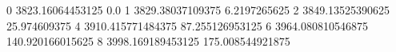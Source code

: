0 3823.16064453125 0.0
1 3829.38037109375 6.2197265625
2 3849.13525390625 25.974609375
4 3910.415771484375 87.255126953125
6 3964.080810546875 140.920166015625
8 3998.169189453125 175.008544921875
